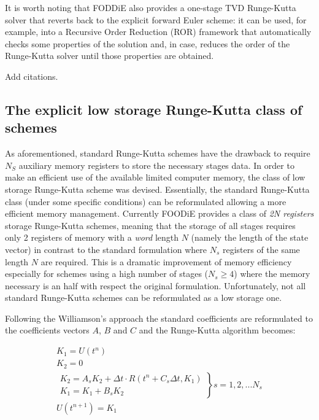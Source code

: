 \documentclass[pdftex,preprint,3p,times,numbers]{elsarticle}
\begin{document}
It is worth noting that FODDiE also provides a one-stage TVD Runge-Kutta solver that reverts back to the explicit forward Euler scheme: it can be used, for example, into a Recursive Order Reduction (ROR) framework that automatically checks some properties of the solution and, in case, reduces the order of the Runge-Kutta solver until those properties are obtained.

{\color{red} Add citations.}

\subsection{The explicit low storage Runge-Kutta class of schemes}

As aforementioned, standard Runge-Kutta schemes have the drawback to require $N_S$ auxiliary memory registers to store the necessary stages data. In order to make an efficient use of the available limited computer memory, the class of low storage Runge-Kutta scheme was devised. Essentially, the standard Runge-Kutta class (under some specific conditions) can be reformulated allowing a more efficient memory management. Currently FOODiE provides a class of \emph{2N registers} storage Runge-Kutta schemes, meaning that the storage of all stages requires only 2 registers of memory with a \emph{word} length $N$ (namely the length of the state vector) in contrast to the standard formulation where $N_s$ registers of the same length $N$ are required. This is a dramatic improvement of memory efficiency especially for schemes using a high number of stages ($N_s \ge 4$) where the memory necessary is an half with respect the original formulation. Unfortunately, not all standard Runge-Kutta schemes can be reformulated as a low storage one.

Following the Williamson's approach the standard coefficients are reformulated to the coefficients vectors $A$, $B$ and $C$ and the Runge-Kutta algorithm becomes:

\begin{equation}
\begin{matrix}
  K_1 = U\left(t^n\right) \\
  K_2 = 0 \\
  \left.\begin{matrix}
    K_2 = A_s K_2 + \Delta t \cdot R\left(t^n + C_s \Delta t, K_1\right) \\
    K_1 = K_1 + B_s K_2
  \end{matrix}\right\} s=1,2,...N_s\\
  U\left(t^{n+1}\right) = K_1
  \end{matrix}
\label{eq:RK-ls}
\end{equation}
\end{document}
